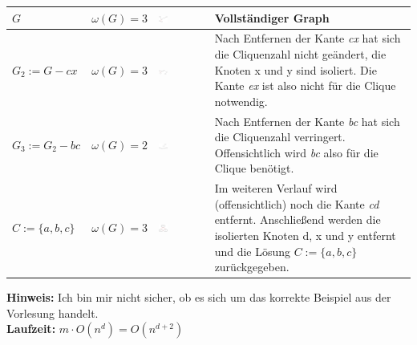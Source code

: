 \documentclass{article} %
\begin{document}
\begin{table}[h]
\centering
\begin{tabular}{|l|l|l|p{8cm}|}
\hline
$G$ &  $\omega (G) = 3$ & \includegraphics[width=0.2\textwidth,trim=0 0 0 -5]{img/clique1.png} &   Vollständiger Graph \\ \hline
$G_2 := G - cx$ &  $\omega (G) = 3$ & \includegraphics[width=0.2\textwidth,trim=0 0 0 -5]{img/clique2.png} & Nach Entfernen der Kante \emph{cx} hat sich die Cliquenzahl nicht geändert, die Knoten x und y sind isoliert.
Die Kante \emph{ex} ist also nicht für die Clique notwendig. \\ \hline
$G_3 := G_2 - bc $  & $\omega (G) = 2$  & \includegraphics[width=0.2\textwidth,trim=0 0 0 -5]{img/clique4.png} & Nach Entfernen der Kante \emph{bc} hat sich die Cliquenzahl verringert.
 Offensichtlich wird \emph{bc} also für die Clique benötigt. \\ \hline
$C := \{a,b,c\} $  & $\omega (G) = 3$  & \includegraphics[width=0.2\textwidth,trim=0 0 0 -5]{img/clique3.png} & Im weiteren Verlauf wird (offensichtlich) noch die Kante \emph{cd} entfernt. Anschließend werden die isolierten Knoten d, x und y entfernt und die Lösung $C := \{a,b,c\}$ zurückgegeben.\\ \hline
\end{tabular}
\end{table}

\textbf{Hinweis:} Ich bin mir nicht sicher, ob es sich um das korrekte Beispiel aus der Vorlesung handelt.\\

\textbf{Laufzeit:} $m \cdot O(n^d) = O(n^{d+2})$
\end{document}
